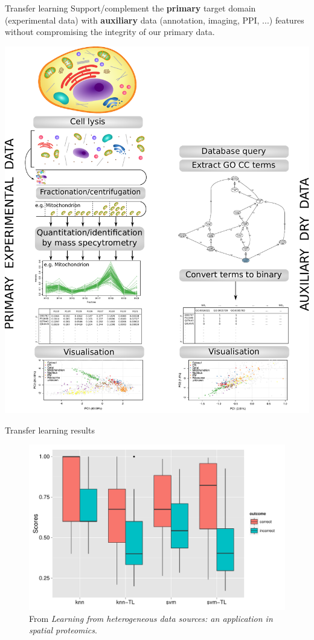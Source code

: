 \begin{frame}{}

  \begin{block}{Transfer learning}
    Support/complement the \textbf{primary} target domain
    (experimental data) with \textbf{auxiliary} data (annotation,
    imaging, PPI, ...)  features without compromising the integrity of
    our primary data.
  \end{block}

\end{frame}


\begin{frame}
  \begin{center}
    \includegraphics[width=.7\linewidth]{figs_all/workflow.pdf}
  \end{center}
\end{frame}


\begin{frame}{Transfer learning results}

  \begin{figure}[h]
    \centering
    \includegraphics[width=.8\linewidth]{./figs_all/2016-PLoSCB-TL-classifierDiscriminationPowerk5.pdf}
    \caption{{\footnotesize From \cite{Breckels:2016} \textit{Learning from
          heterogeneous data sources: an application in spatial
          proteomics}.}
    }
\label{fig:tlres}
  \end{figure}

\end{frame}


